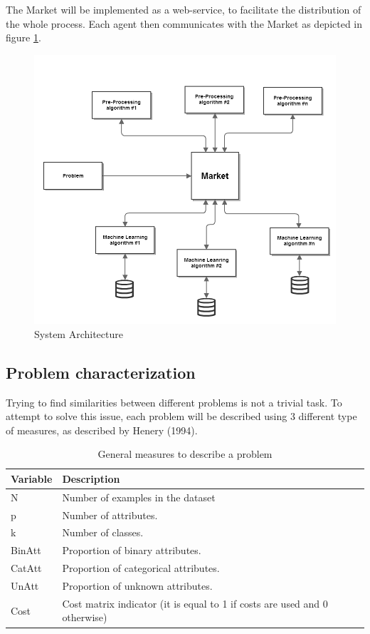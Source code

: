 \documentclass{llncs}
\begin{document}
The Market will be implemented as a web-service, to facilitate the distribution of the whole process. Each agent then communicates with the Market as depicted in figure \ref{fig:marketArc}. 
\begin{figure}
\centering
\includegraphics[width=\linewidth]{SSIM_architecture}
\caption{System Architecture}
\label{fig:marketArc}
\end{figure}


\subsection{Problem characterization}

Trying to find similarities between different problems is not a trivial task. To attempt to solve this issue, each problem will be described using 3 different type of measures, as described by Henery (1994)\cite{bib:Hen}. 

\begin{table}[h]
\centering
\begin{tabular}{l l}
\textbf{Variable} & \textbf{Description} \\
\hline
N &  Number of examples in the dataset \\
p & Number of attributes. \\
k & Number of classes. \\
BinAtt & Proportion of binary attributes.\\
CatAtt & Proportion of categorical attributes. \\
UnAtt & Proportion of unknown attributes. \\
Cost & Cost matrix indicator (it is equal to 1 if costs are used and 0 otherwise) \\
\hline
\end{tabular}
\caption{General measures to describe a problem}
\label{tab:gen}
\end{table}
\end{document}
